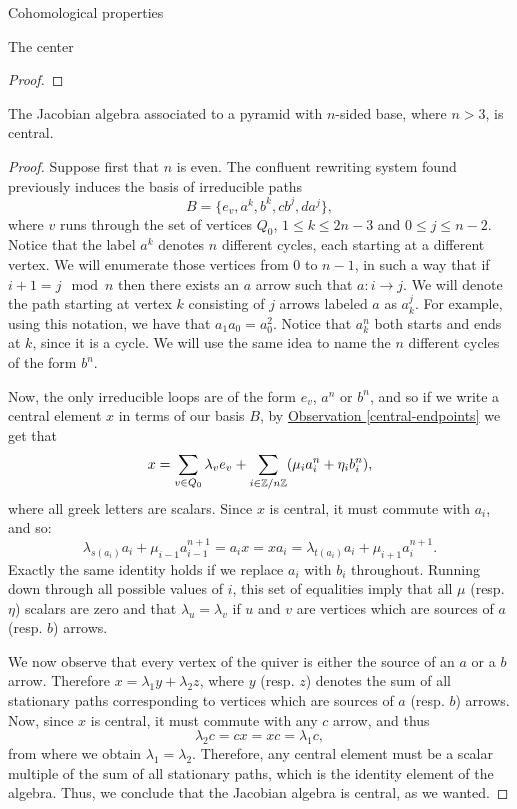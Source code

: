 \begin{chapter}{Cohomological properties}
\begin{section}{The center}
\begin{proof}
\end{proof}

\begin{prop} The Jacobian algebra associated to a pyramid with $n$-sided base, where $n>3$, is central.
\end{prop}
\begin{proof} Suppose first that $n$ is even. The confluent rewriting system found previously induces the basis of irreducible paths 
\[B=\{e_v,a^k,b^k,cb^j, da^j\},\] 
where $v$ runs through the set of vertices $Q_0$, $1\leq k\leq 2n-3$ and $0\leq j\leq n-2$. Notice that the label $a^k$ denotes $n$ different cycles, each starting at a different vertex. We will enumerate those vertices from $0$ to $n-1$, in such a way that if $i+1=j \mod n$ then there exists an $a$ arrow such that $a:i\to j$. We will denote the path starting at vertex $k$ consisting of $j$ arrows labeled $a$ as $a_k^j$. For example, using this notation, we have that $a_1a_0=a_0^2$. Notice that $a_k^n$ both starts and ends at $k$, since it is a cycle. We will use the same idea to name the $n$ different cycles of the form $b^n$.

Now, the only irreducible loops are of the form $e_v$, $a^n$ or $b^n$, and so if we write a central element $x$ in terms of our basis $B$, by \hyperref[central-endpoints]{Observation \ref*{central-endpoints}} we get that
\[x = \sum_{v\in Q_0} \lambda_v e_v + \sum_{i\in \mathbb{Z}/n\mathbb{Z}}(\mu_i a_i^n + \eta_i b_i^n),\]
where all greek letters are scalars. Since $x$ is central, it must commute with $a_i$, and so:
\[\lambda_{s(a_i)}a_i + \mu_{i-1} a_{i-1}^{n+1}=a_ix = xa_i = \lambda_{t(a_i)}a_i + \mu_{i+1} a_i^{n+1}.\]
Exactly the same identity holds if we replace $a_i$ with $b_i$ throughout. Running down through all possible values of $i$, this set of equalities imply that all $\mu$ (resp. $\eta$) scalars are zero and that $\lambda_u=\lambda_v$ if $u$ and $v$ are vertices which are sources of $a$ (resp. $b$) arrows.

We now observe that every vertex of the quiver is either the source of an $a$ or a $b$ arrow. Therefore $x=\lambda_1 y + \lambda_2 z$, where $y$ (resp. $z$) denotes the sum of all stationary paths corresponding to vertices which are sources of $a$ (resp. $b$) arrows. Now, since $x$ is central, it must commute with any $c$ arrow, and thus
\[\lambda_2 c = cx = xc = \lambda_1 c,\]
from where we obtain $\lambda_1=\lambda_2$. Therefore, any central element must be a scalar multiple of the sum of all stationary paths, which is the identity element of the algebra. Thus, we conclude that the Jacobian algebra is central, as we wanted.


\end{proof}
\end{section}
\end{chapter}
